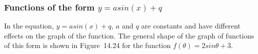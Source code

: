     \addtocounter{footnote}{-0}
    
      
      \label{m39414*uid32}
            \subsubsection{ Functions of the form $y=asin\left(x\right)+q$}
            \nopagebreak
            
        
        \label{m39414*id84527}In the equation, \begin{math}y=asin\left(x\right)+q\end{math}, \begin{math}a\end{math} and \begin{math}q\end{math} are constants and have different effects on the graph of the function. The general shape of the graph of functions of this form is shown in Figure~14.24 for the function \begin{math}f\left(\theta \right)=2sin\theta +3\end{math}.\par 
        
    \setcounter{subfigure}{0}



